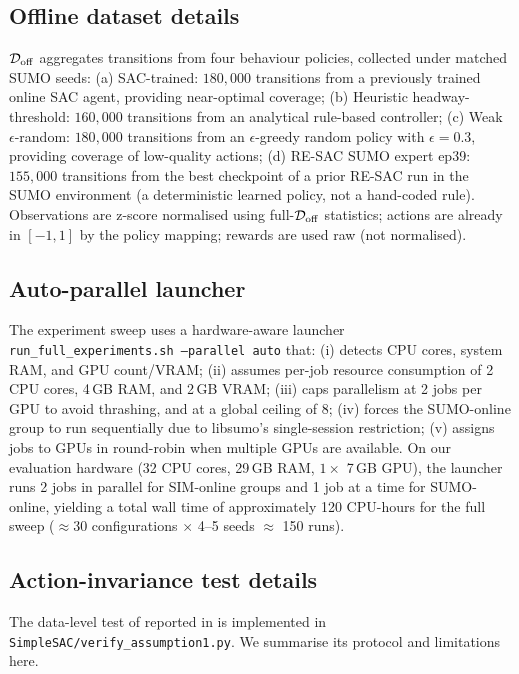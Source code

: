 \subsection{Offline dataset details}

$\mathcal{D}_{\mathrm{off}}$ aggregates transitions from four behaviour policies, collected under matched SUMO seeds:
(a) SAC-trained: $180{,}000$ transitions from a previously trained online SAC agent, providing near-optimal coverage;
(b) Heuristic headway-threshold: $160{,}000$ transitions from an analytical rule-based controller;
(c) Weak $\epsilon$-random: $180{,}000$ transitions from an $\epsilon$-greedy random policy with $\epsilon = 0.3$, providing coverage of low-quality actions;
(d) RE-SAC SUMO expert ep39: $155{,}000$ transitions from the best checkpoint of a prior RE-SAC run in the SUMO environment (a deterministic learned policy, not a hand-coded rule).
Observations are z-score normalised using full-$\mathcal{D}_{\mathrm{off}}$ statistics; actions are already in $[-1, 1]$ by the policy mapping; rewards are used raw (not normalised).

\subsection{Auto-parallel launcher}
\label{app:impl:parallel}

The experiment sweep uses a hardware-aware launcher \texttt{run\_\allowbreak full\_\allowbreak experiments.sh --parallel auto} that:
(i) detects CPU cores, system RAM, and GPU count/VRAM;
(ii) assumes per-job resource consumption of 2 CPU cores, 4\,GB RAM, and 2\,GB VRAM;
(iii) caps parallelism at 2 jobs per GPU to avoid thrashing, and at a global ceiling of 8;
(iv) forces the SUMO-online group to run sequentially due to libsumo's single-session restriction;
(v) assigns jobs to GPUs in round-robin when multiple GPUs are available.
On our evaluation hardware (32 CPU cores, 29\,GB RAM, $1\times$ 7\,GB GPU), the launcher runs 2 jobs in parallel for SIM-online groups and 1 job at a time for SUMO-online, yielding a total wall time of approximately 120 CPU-hours for the full sweep ($\approx$30 configurations $\times$ 4--5 seeds $\approx$ 150 runs).

\subsection{Action-invariance test details}
\label{app:assumption1}

The data-level test of  reported in  is implemented in \texttt{SimpleSAC/verify\_assumption1.py}.
We summarise its protocol and limitations here.

